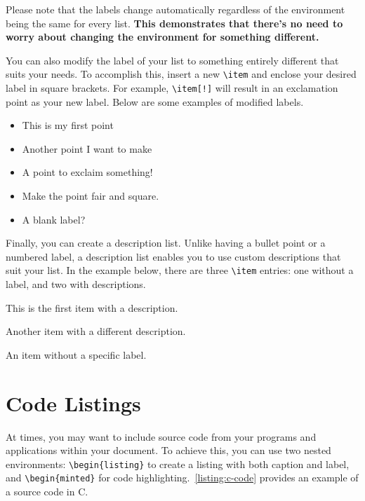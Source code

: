 \begin{block}[tip]
    Please note that the labels change automatically regardless of the environment being the same for every list. \textbf{This demonstrates that there's no need to worry about changing the environment for something different.}
\end{block}

You can also modify the label of your list to something entirely different that suits your needs. To accomplish this, insert a new \verb|\item| and enclose your desired label in square brackets. For example, \verb|\item[!]| will result in an exclamation point as your new label. Below are some examples of modified labels.

\begin{itemize}
    \item This is my first point
    \item Another point I want to make
    \item[!] A point to exclaim something!
    \item[\(\blacksquare\)] Make the point fair and square.
    \item[] A blank label?
\end{itemize}

Finally, you can create a description list. Unlike having a bullet point or a numbered label, a description list enables you to use custom descriptions that suit your list. In the example below, there are three \verb|\item| entries: one without a label, and two with descriptions.

\begin{description}
    \item[Item 1:] This is the first item with a description.
    \item[Item 2:] Another item with a different description.
    \item An item without a specific label.
\end{description}

\section{Code Listings}
At times, you may want to include source code from your programs and applications within your document. To achieve this, you can use two nested environments: \verb|\begin{listing}| to create a listing with both caption and label, and \verb|\begin{minted}| for code highlighting.\ \autoref{listing:c-code} provides an example of a source code in C.

